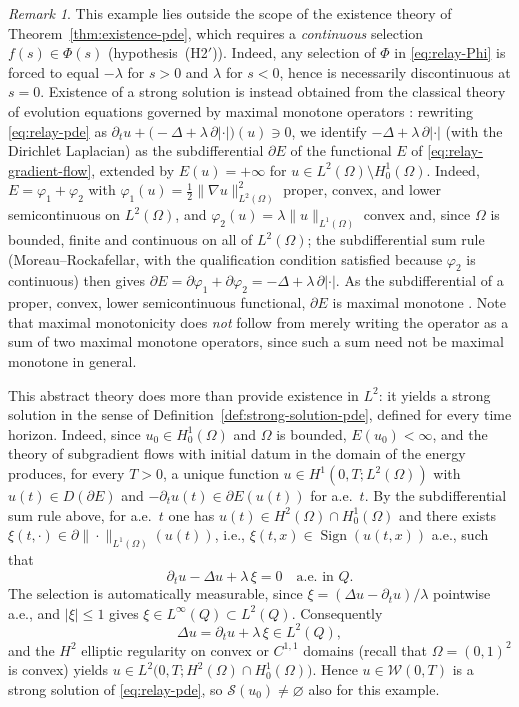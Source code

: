 \documentclass[11pt]{elsarticle}
\theoremstyle{definition}
\theoremstyle{remark}
\newtheorem{remark}[theorem]{Remark}
\numberwithin{equation}{section}
\DeclareMathOperator{\Sign}{Sign}
\begin{document}
\begin{remark}\label{rem:relay-wellposed}
	This example lies outside the scope of the existence theory of
	Theorem~\ref{thm:existence-pde}, which requires a \emph{continuous}
	selection $f(s)\in\Phi(s)$ (hypothesis~(H2$'$)). Indeed, any selection of
	$\Phi$ in \eqref{eq:relay-Phi} is forced to equal $-\lambda$ for $s>0$
	and $\lambda$ for $s<0$, hence is necessarily discontinuous at $s=0$.
	Existence of a strong solution is instead obtained from the classical
	theory of evolution equations governed by maximal monotone operators
	\cite{Brezis1973}: rewriting \eqref{eq:relay-pde} as
	$\partial_t u + \bigl(-\Delta+\lambda\,\partial|\cdot|\bigr)(u)\ni 0$,
	we identify $-\Delta+\lambda\,\partial|\cdot|$ (with the Dirichlet
	Laplacian) as the subdifferential $\partial E$ of the functional $E$ of
	\eqref{eq:relay-gradient-flow}, extended by $E(u)=+\infty$ for
	$u\in L^2(\Omega)\setminus H_0^1(\Omega)$. Indeed, $E=\varphi_1+\varphi_2$
	with $\varphi_1(u)=\tfrac12\|\nabla u\|_{L^2(\Omega)}^2$ proper, convex,
	and lower semicontinuous on $L^2(\Omega)$, and
	$\varphi_2(u)=\lambda\|u\|_{L^1(\Omega)}$ convex and, since $\Omega$ is
	bounded, finite and continuous on all of $L^2(\Omega)$; the subdifferential
	sum rule (Moreau--Rockafellar, with the qualification condition satisfied
	because $\varphi_2$ is continuous) then gives
	$\partial E=\partial\varphi_1+\partial\varphi_2
	=-\Delta+\lambda\,\partial|\cdot|$. As the subdifferential of a proper,
	convex, lower semicontinuous functional, $\partial E$ is maximal monotone
	\cite{Brezis1973}. Note that maximal monotonicity does \emph{not} follow
	from merely writing the operator as a sum of two maximal monotone
	operators, since such a sum need not be maximal monotone in general.
	
	This abstract theory does more than provide existence in $L^2$: it
	yields a strong solution in the sense of
	Definition~\ref{def:strong-solution-pde}, defined for every time
	horizon. Indeed, since $u_0\in H_0^1(\Omega)$ and $\Omega$ is bounded,
	$E(u_0)<\infty$, and the theory of subgradient flows with initial datum
	in the domain of the energy \cite{Brezis1973} produces, for every
	$T>0$, a unique function $u\in H^1(0,T;L^2(\Omega))$ with
	$u(t)\in D(\partial E)$ and
	$-\partial_tu(t)\in\partial E(u(t))$ for a.e.\ $t$. By the
	subdifferential sum rule above, for a.e.\ $t$ one has
	$u(t)\in H^2(\Omega)\cap H_0^1(\Omega)$ and there exists
	$\xi(t,\cdot)\in\partial\|\cdot\|_{L^1(\Omega)}(u(t))$, i.e.,
	$\xi(t,x)\in\Sign(u(t,x))$ a.e., such that
	\[
	\partial_tu-\Delta u+\lambda\,\xi=0
	\quad\text{a.e.\ in }Q.
	\]
	The selection is automatically measurable, since
	$\xi=(\Delta u-\partial_tu)/\lambda$ pointwise a.e., and
	$|\xi|\le1$ gives $\xi\in L^\infty(Q)\subset L^2(Q)$. Consequently
	\[
	\Delta u=\partial_tu+\lambda\,\xi\in L^2(Q),
	\]
	and the $H^2$ elliptic regularity on convex or $C^{1,1}$ domains
	\cite[Theorem~3.2.1.2]{Grisvard1985} (recall that $\Omega=(0,1)^2$ is
	convex) yields
	$u\in L^2\bigl(0,T;H^2(\Omega)\cap H_0^1(\Omega)\bigr)$. Hence
	$u\in\mathcal{W}(0,T)$ is a strong solution of
	\eqref{eq:relay-pde}, so $\mathcal{S}(u_0)\neq\varnothing$ also for
	this example.
	

\end{remark}
\end{document}
